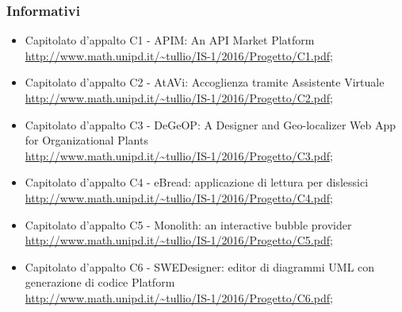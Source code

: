 		\subsubsection {Informativi}
			\begin {itemize}
				\item Capitolato d'appalto C1 - APIM: An API Market Platform \\
					\url {http://www.math.unipd.it/~tullio/IS-1/2016/Progetto/C1.pdf};
				\item Capitolato d'appalto C2 - AtAVi: Accoglienza tramite Assistente Virtuale \\
				\url {http://www.math.unipd.it/~tullio/IS-1/2016/Progetto/C2.pdf};
				\item Capitolato d'appalto C3 - DeGeOP: A Designer and Geo-localizer Web App for Organizational Plants \\
					\url {http://www.math.unipd.it/~tullio/IS-1/2016/Progetto/C3.pdf};
					\item Capitolato d'appalto C4 - eBread: applicazione di lettura per dislessici  \\
					\url {http://www.math.unipd.it/~tullio/IS-1/2016/Progetto/C4.pdf};
					\item Capitolato d'appalto C5 - Monolith: an interactive bubble provider \\
					\url {http://www.math.unipd.it/~tullio/IS-1/2016/Progetto/C5.pdf};
					\item Capitolato d'appalto C6 - SWEDesigner: editor di diagrammi UML con generazione di codice Platform \\
					\url {http://www.math.unipd.it/~tullio/IS-1/2016/Progetto/C6.pdf};
					
				
			\end {itemize}
		
		